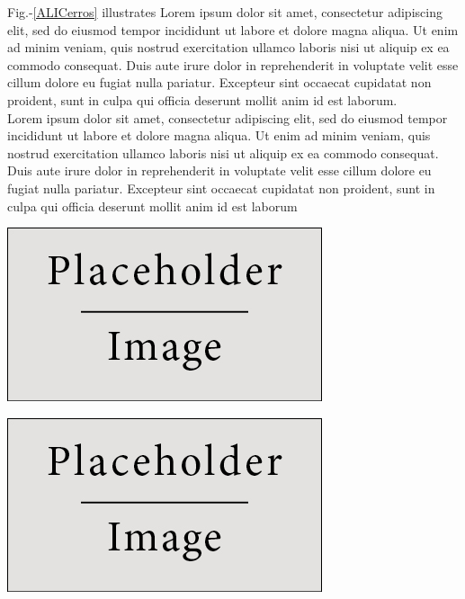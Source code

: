 \documentclass[a0,portrait]{a0poster}
\begin{document}
\begin{minipage}[c]{\linewidth}
\begin{framed}
\begin{multicols}{2}
\begin{center}
\label{ALICerros}
\end{center}
Fig.-\ref{ALICerros} illustrates Lorem ipsum dolor sit amet, consectetur adipiscing elit, sed do eiusmod tempor incididunt ut labore et dolore magna aliqua. Ut enim ad minim veniam, quis nostrud exercitation ullamco laboris nisi ut aliquip ex ea commodo consequat. Duis aute irure dolor in reprehenderit in voluptate velit esse cillum dolore eu fugiat nulla pariatur. Excepteur sint occaecat cupidatat non proident, sunt in culpa qui officia deserunt mollit anim id est laborum.\\
Lorem ipsum dolor sit amet, consectetur adipiscing elit, sed do eiusmod tempor incididunt ut labore et dolore magna aliqua. Ut enim ad minim veniam, quis nostrud exercitation ullamco laboris nisi ut aliquip ex ea commodo consequat. Duis aute irure dolor in reprehenderit in voluptate velit esse cillum dolore eu fugiat nulla pariatur. Excepteur sint occaecat cupidatat non proident, sunt in culpa qui officia deserunt mollit anim id est laborum
\begin{center}
\includegraphics[width=0.9\linewidth]{figures/placeholder}
\label{GIMupdown}
\end{center}
\vspace{0.1cm}
\begin{center}
\includegraphics[width=0.9\linewidth]{figures/placeholder}
\label{GIMlatlon}
\end{center}
\color{Black}

\end{multicols}
\end{framed}
\end{minipage}
\end{document}
